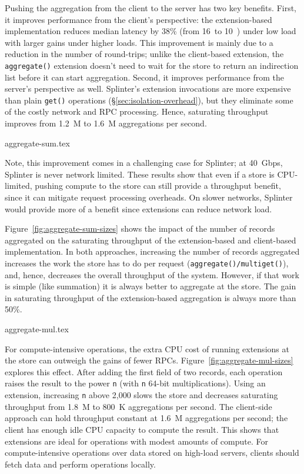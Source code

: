 Pushing the aggregation from the client to the server has two key benefits.
First, it improves performance from the client's perspective: the
  extension-based implementation reduces median latency by 38\% (from
  16~\us to 10~\us) under low load with larger gains under higher loads.
This improvement is mainly due to a reduction in the number of round-trips;
unlike the client-based extension, the \texttt{aggregate()} extension doesn't
  need to wait for the store to return an indirection list before it can start
  aggregation.
Second, it improves performance from the server's perspective as well.
Splinter's extension invocations are more expensive than plain \texttt{get()}
  operations (\S\ref{sec:isolation-overhead}), but they eliminate
  some of the costly network and RPC processing.
Hence, saturating throughput improves from 1.2~M to 1.6~M aggregations
  per second.

 {aggregate-sum.tex}

Note, this improvement comes in a challenging case for Splinter; at 40~Gbps,
  Splinter is never network limited.
These results show that even if a store is CPU-limited, pushing compute to the
  store can still provide a throughput benefit, since it can mitigate
  request processing overheads.
On slower networks, Splinter would provide more of a benefit since extensions
  can reduce network load.

Figure~\ref{fig:aggregate-sum-sizes} shows the impact of the number of
  records aggregated on the saturating throughput of the extension-based
  and client-based implementation.
In both approaches, increasing the number of records aggregated
  increases the work the store has to do per request
  (\texttt{aggregate()/multiget()}), and, hence, decreases the overall
  throughput of the system. 
However, if that work is simple (like summation) it is always better to
  aggregate at the store.
The gain in saturating throughput of the extension-based aggregation is
  always more than 50\%.

 {aggregate-mul.tex}

For compute-intensive operations, the extra CPU cost of
running extensions at the store can outweigh the gains of fewer RPCs.
Figure~\ref{fig:aggregate-mul-sizes} explores this effect.
After adding the first field of two records, each operation raises the
  result to the power \texttt{n} (with \texttt{n} 64-bit
  multiplications).
Using an extension, increasing \texttt{n} above 2,000
  slows the store and decreases
  saturating throughput from 1.8~M to 800~K aggregations per second.
The client-side approach can hold throughput constant
  at 1.6~M aggregations per second;
the client has enough idle CPU capacity to compute the result.
This shows that extensions are ideal for operations with
  modest amounts of compute.
For compute-intensive operations over data stored on high-load servers,
  clients should fetch data and perform operations locally.

